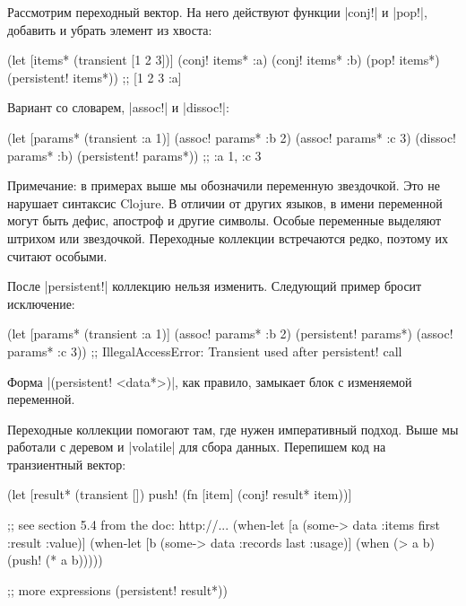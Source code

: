 Рассмотрим переходный вектор. На него действуют функции \spverb|conj!| и
\spverb|pop!|, добавить и убрать элемент из хвоста:

\begin{english}
  \begin{clojure}
(let [items* (transient [1 2 3])]
  (conj! items* :a)
  (conj! items* :b)
  (pop! items*)
  (persistent! items*))
;; [1 2 3 :a]
  \end{clojure}
\end{english}

\noindent
Вариант со словарем, \spverb|assoc!| и \spverb|dissoc!|:

\begin{english}
  \begin{clojure}
(let [params* (transient {:a 1})]
  (assoc! params* :b 2)
  (assoc! params* :c 3)
  (dissoc! params* :b)
  (persistent! params*))
;; {:a 1, :c 3}
  \end{clojure}
\end{english}

Примечание: в примерах выше мы обозначили переменную звездочкой. Это не нарушает
синтаксис Clojure. В отличии от других языков, в имени переменной могут быть
дефис, апостроф и другие символы. Особые переменные выделяют штрихом или
звездочкой. Переходные коллекции встречаются редко, поэтому их считают особыми.

После \spverb|persistent!| коллекцию нельзя изменить. Следующий пример бросит
исключение:

\begin{english}
  \begin{clojure}
(let [params* (transient {:a 1})]
  (assoc! params* :b 2)
  (persistent! params*)
  (assoc! params* :c 3))
;; IllegalAccessError: Transient used after persistent! call
  \end{clojure}
\end{english}

Форма \spverb|(persistent! <data*>)|, как правило, замыкает блок с изменяемой
переменной.

Переходные коллекции помогают там, где нужен императивный подход. Выше мы
работали с деревом и \spverb|volatile| для сбора данных. Перепишем код на
транзиентный вектор:

\begin{english}
  \begin{clojure}
(let [result* (transient [])
      push! (fn [item]
              (conj! result* item))]

  ;; see section 5.4 from the doc: http://...
  (when-let [a (some-> data :items first :result :value)]
    (when-let [b (some-> data :records last :usage)]
      (when (> a b)
        (push! (* a b)))))

  ;; more expressions
  (persistent! result*))
  \end{clojure}
\end{english}

